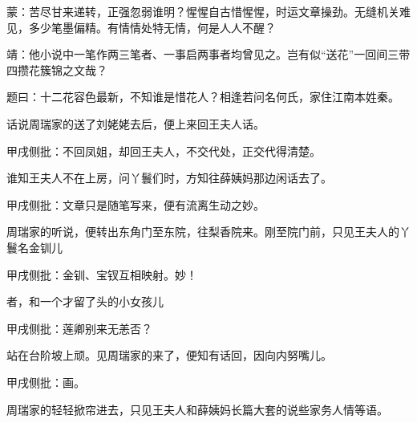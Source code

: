 \begin{parag}
    \begin{note}蒙：苦尽甘来递转，正强忽弱谁明？惺惺自古惜惺惺，时运文章操劲。无缝机关难见，多少笔墨偏精。有情情处特无情，何是人人不醒？\end{note}
\end{parag}


\begin{parag}
    \begin{note}靖：他小说中一笔作两三笔者、一事启两事者均曾见之。岂有似“送花”一回间三带四攒花簇锦之文哉？\end{note}
\end{parag}


\begin{parag}
    题曰：十二花容色最新，不知谁是惜花人？相逢若问名何氏，家住江南本姓秦。
\end{parag}


\begin{parag}
    话说周瑞家的送了刘姥姥去后，便上来回王夫人话。\begin{note}甲戌侧批：不回凤姐，却回王夫人，不交代处，正交代得清楚。\end{note}谁知王夫人不在上房，问丫鬟们时，方知往薛姨妈那边闲话去了。\begin{note}甲戌侧批：文章只是随笔写来，便有流离生动之妙。\end{note}周瑞家的听说，便转出东角门至东院，往梨香院来。刚至院门前，只见王夫人的丫鬟名金钏儿\begin{note}甲戌侧批：金钏、宝钗互相映射。妙！\end{note}者，和一个才留了头的小女孩儿\begin{note}甲戌侧批：莲卿别来无恙否？\end{note}站在台阶坡上顽。见周瑞家的来了，便知有话回，因向内努嘴儿。\begin{note}甲戌侧批：画。\end{note}周瑞家的轻轻掀帘进去，只见王夫人和薛姨妈长篇大套的说些家务人情等语。
\end{parag}


